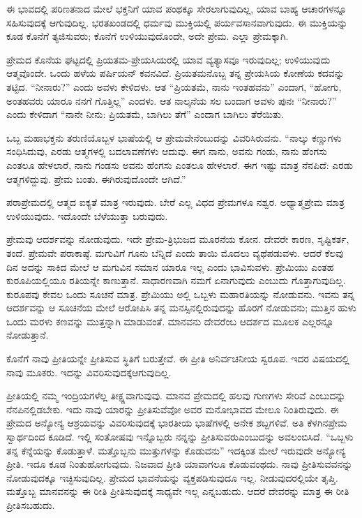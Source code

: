 ಈ ಭಾವದಲ್ಲಿ ಪರಿಣತನಾದ ಮೇಲೆ ಭಕ್ತನಿಗೆ ಯಾವ ಪಂಥಕ್ಕೂ ಸೇರಲಾಗುವುದಿಲ್ಲ, ಯಾವ ಬಾಹ್ಯ ಆಚಾರಗಳನ್ನೂ ಸಹಿಸುವುದಕ್ಕೆ ಆಗುವುದಿಲ್ಲ. ಭರತಖಂಡದಲ್ಲಿ ಧರ್ಮವು ಮುಕ್ತಿಯಲ್ಲಿ ಪರ್ಯವಸಾನವಾಗುವುದು. ಈ ಮುಕ್ತಿಯನ್ನು ಕೂಡ ಕೊನೆಗೆ ತ್ಯಜಿಸುವರು; ಕೊನೆಗೆ ಉಳಿಯುವುದೊಂದೇ, ಅದೇ ಪ್ರೇಮ. ಎಲ್ಲಾ ಪ್ರೇಮಕ್ಕಾಗಿ.

ಪ್ರೇಮದ ಕೊನೆಯ ಘಟ್ಟದಲ್ಲಿ ಪ್ರಿಯತಮ-ಪ್ರೇಯಸಿಯರಲ್ಲಿ ಯಾವ ವ್ಯತ್ಯಾಸವೂ ಇರುವುದಿಲ್ಲ; ಉಳಿಯುವುದು ಆತ್ಮವೊಂದೇ. ಒಂದು ಹಳೆಯ ಪರ್ಷಿಯನ್​ ಕವನವಿದೆ. ಪ್ರಿಯತಮನೊಬ್ಬ ತನ್ನ ಪ್ರೇಯಸಿಯ ಕೋಣೆಯ ಕದವನ್ನು ತಟ್ಟಿದ. “ನೀನಾರು?” ಎಂದು ಅವಳು ಕೇಳಿದಳು. ಆತ “ಪ್ರಿಯತಮೆ, ನಾನು ಇಂತಹವನು” ಎಂದಾಗ, “ಹೋಗು, ಅಂತಹವರು ಯಾರೂ ನನಗೆ ಗೊತ್ತಿಲ್ಲ” ಎಂದಳು. ಆತ ನಾಲ್ಕನೆಯ ಸಲ ಬಂದಾಗ ಅವಳು ಪುನಃ “ನೀನಾರು?” ಎಂದು ಕೇಳಿದಾಗ “ನಾನೇ ನೀನು: ಪ್ರಿಯತಮೆ, ಬಾಗಿಲು ತೆಗೆ” ಎಂದಾಗ ಬಾಗಿಲು ತೆರೆಯಿತು.

ಒಬ್ಬ ಮಹಾಭಕ್ತನು ತರುಣಿಯೊಬ್ಬಳ ಭಾಷೆಯಲ್ಲಿ ಆ ಪ್ರೇಮವೇನೆಂಬುದನ್ನು ವಿವರಿಸಿರುವನು. “ನಾಲ್ಕು ಕಣ್ಣುಗಳು ಸಂಧಿಸಿದುವು, ಎರಡು ಆತ್ಮಗಳಲ್ಲಿ ಬದಲಾವಣೆಗಳು ಆದುವು. ಈಗ ನಾನು, ಅವನು ಗಂಡು, ನಾನು ಹೆಂಗಸು ಎಂತಲೂ ಹೇಳಲಾರೆ, ನಾನು ಗಂಡಸು ಅವನು ಹೆಂಗಸು ಎಂತಲೂ ಹೇಳಲಾರೆ. ಈಗ ಇಷ್ಟು ಮಾತ್ರ ನೆನಪಿದೆ: ಎರಡು ಆತ್ಮಗಳಿದ್ದುವು. ಪ್ರೇಮ ಬಂತು. ಈಗಿರುವುದೊಂದೇ ಆಗಿದೆ.”

ಪರಾಪ್ರೇಮದಲ್ಲಿ ಆತ್ಮದ ಐಕ್ಯತೆ ಮಾತ್ರ ಇರುವುದು. ಬೇರೆ ಎಲ್ಲ ವಿಧದ ಪ್ರೇಮಗಳೂ ನಶ್ವರ. ಅಧ್ಯಾತ್ಮಪ್ರೇಮ ಮಾತ್ರ ಉಳಿಯುವುದು. ಇದೊಂದೇ ಬೆಳೆಯುತ್ತಾ ಬರುವುದು.

ಪ್ರೇಮವು ಆದರ್ಶವನ್ನು ನೋಡುವುದು. ಇದೇ ಪ್ರೇಮ-ತ್ರಿಭುಜದ ಮೂರನೆಯ ಕೋನ. ದೇವರೇ ಕಾರಣ, ಸೃಷ್ಟಿಕರ್ತ, ತಂದೆ. ಪ್ರೇಮವೇ ಪರಾಕಾಷ್ಠೆ. ಮಗುವಿಗೆ ಗೂನು ಬೆನ್ನಿದೆ ಎಂದು ತಾಯಿ ಮೊದಲು ವ್ಯಥೆಪಡುವಳು. ಆದರೆ ಕೆಲವು ದಿನ ಅದನ್ನು ಸಾಕಿದ ಮೇಲೆ ಆ ಮಗುವಿನ ಸಮಾನ ಯಾರೂ ಇಲ್ಲ ಎಂದು ಭಾವಿಸುವಳು. ಪ್ರೇಮಿಯು ಎಂತಹ ಕುರೂಪಿಯಲ್ಲಿಯೂ ರತಿಯನ್ನೇ ಕಾಣುತ್ತಾನೆ. ಸಾಧಾರಣವಾಗಿ ನಮಗೆ ಏನಾಗುವುದು ಎಂಬುದು ಗೊತ್ತಾಗುವುದಿಲ್ಲ. ಕುರೂಪವು ಕೇವಲ ಒಂದು ಸೂಚನೆ ಮಾತ್ರ. ಪ್ರೇಮಿಯು ಅಲ್ಲಿ ಒಬ್ಬಳು ಮಹಾರತಿಯನ್ನು ನೋಡುವನು. ಇವನು ತನ್ನ ಆದರ್ಶವನ್ನು ಆ ಸೂಚನೆಯ ಮೇಲೆ ಆರೋಪಿಸಿ ತನ್ನ ಮನಸ್ಸಿನಲ್ಲಿರುವುದನ್ನು ಹೊರಗೆ ನೋಡುವನು; ಮುತ್ತಿನ ಹುಳು ಒಂದು ಮರಳು ಕಣವನ್ನು ಮುತ್ತನ್ನಾಗಿ ಮಾಡುವಂತೆ. ಮಾನವನು ದೇವರೆಂಬ ಆದರ್ಶದ ಮೂಲಕ ಎಲ್ಲರನ್ನೂ ನೋಡುತ್ತಾನೆ.

ಕೊನೆಗೆ ನಾವು ಪ್ರೀತಿಯನ್ನೇ ಪ್ರೀತಿಸುವ ಸ್ಥಿತಿಗೆ ಬರುತ್ತೇವೆ. ಈ ಪ್ರೀತಿ ಅನಿರ್ವಚನೀಯ ಸ್ವರೂಪ. ಇದರ ವಿಷಯದಲ್ಲಿ ನಾವು ಮೂಕರು. ಇದನ್ನು ವಿವರಿಸುವುದಕ್ಕೆ\break ಆಗುವುದಿಲ್ಲ.

ಪ್ರೀತಿಯಲ್ಲಿ ನಮ್ಮ ಇಂದ್ರಿಯಗಳೆಲ್ಲ ತೀಕ್ಷ್ಣವಾಗುವುವು. ಮಾನವ ಪ್ರೇಮದಲ್ಲಿ ಹಲವು ಗುಣಗಳು ಸೇರಿವೆ ಎಂಬುದನ್ನು ನೆನಪಿನಲ್ಲಿಡಬೇಕು. ಇದು ನಾವು ಯಾರನ್ನು ಪ್ರೀತಿಸುವೆವೋ ಅವರ ಮನೋಭಾವದ ಮೇಲೂ ನಿಂತಿರುವುದು. ಈ ಪ್ರೇಮದ ಅನ್ಯೋನ್ಯ ಆಶ್ರಯವನ್ನು ವಿವರಿಸುವುದಕ್ಕೆ ಭಾರತೀಯ ಭಾಷೆಗಳಲ್ಲಿ ಅನೇಕ ಶಬ್ದಗಳಿವೆ. ಅತಿ ಕೆಳಗಿನ\break ಪ್ರೇಮ ಸ್ವಾರ್ಥದಿಂದ ಕೂಡಿದೆ. ಇಲ್ಲಿ ಸಂತೋಷವು ಇನ್ನೊಬ್ಬರು ನನ್ನನ್ನು ಪ್ರೀತಿಸುವರು\break ಎಂಬುದನ್ನು ಅವಲಂಬಿಸಿದೆ. “ಒಬ್ಬಳು ತನ್ನ ಕೆನ್ನೆಯನ್ನು ಕೊಡುತ್ತಾಳೆ. ಮತ್ತೊಬ್ಬನು ಮುತ್ತುಗಳನ್ನು ಕೊಡುವನು” ಇದಕ್ಕಿಂತ ಮೇಲೆ ಇರುವುದೇ ಅನ್ಯೋನ್ಯ ಪ್ರೀತಿ. ಇದೂ ಕೂಡ ನಿಂತುಹೋಗುವುದು. ನಿಜವಾದ ಪ್ರೀತಿ ಯಾವಾಗಲೂ ಕೊಡುವಂಥದು. ನಾವು ಪ್ರೀತಿಸುವವನನ್ನು ನೋಡುವುದಕ್ಕೂ ಇಚ್ಛಿಸುವುದಿಲ್ಲ. ಪ್ರೇಮದ ಭಾವನೆಯನ್ನು ವ್ಯಕ್ತ\-ಪಡಿಸುವುದೂ ಇಲ್ಲ. ನೀಡುವುದರಲ್ಲಿಯೇ ತೃಪ್ತಿ. ಮತ್ತೊಬ್ಬ ಮಾನವನನ್ನು ಈ ರೀತಿ ಪ್ರೀತಿಸುವುದಕ್ಕೆ ಸಾಧ್ಯವೇ ಇಲ್ಲ ಎನ್ನಬಹುದು. ಆದರೆ ದೇವರನ್ನು ಮಾತ್ರ ಈ ರೀತಿ ಪ್ರೀತಿಸಬಹುದು.

